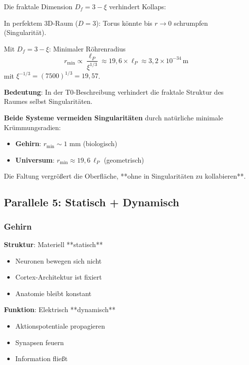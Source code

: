 	Die fraktale Dimension $D_f = 3 - \xi$ verhindert Kollaps:

	In perfektem 3D-Raum ($D=3$): Torus könnte bis $r \to 0$ schrumpfen (Singularität).

	Mit $D_f = 3-\xi$: Minimaler Röhrenradius
	\begin{equation}
		r_{\min} \propto \frac{\ell_P}{\xi^{1/3}} \approx 19{,}6 \times \ell_P \approx 3{,}2 \times 10^{-34}\,\text{m}
	\end{equation}
	mit $\xi^{-1/3} = (7500)^{1/3} = 19{,}57$.

	\textbf{Bedeutung}: In der T0-Beschreibung verhindert die fraktale Struktur des Raumes selbst Singularitäten.

	\begin{keyresult}
		\textbf{Beide Systeme vermeiden Singularitäten} durch natürliche minimale Krümmungsradien:

		\begin{itemize}
			\item \textbf{Gehirn}: $r_{\min} \sim 1$ mm (biologisch)
			\item \textbf{Universum}: $r_{\min} \approx 19{,}6\, \ell_P$ (geometrisch)
		\end{itemize}

		Die Faltung vergrößert die Oberfläche, **ohne in Singularitäten zu kollabieren**.
	\end{keyresult}

	\subsection{Parallele 5: Statisch + Dynamisch}

	\subsubsection{Gehirn}

	\textbf{Struktur}: Materiell **statisch**
	\begin{itemize}
		\item Neuronen bewegen sich nicht
		\item Cortex-Architektur ist fixiert
		\item Anatomie bleibt konstant
	\end{itemize}

	\textbf{Funktion}: Elektrisch **dynamisch**
	\begin{itemize}
		\item Aktionspotentiale propagieren
		\item Synapsen feuern
		\item Information fließt
	\end{itemize}

